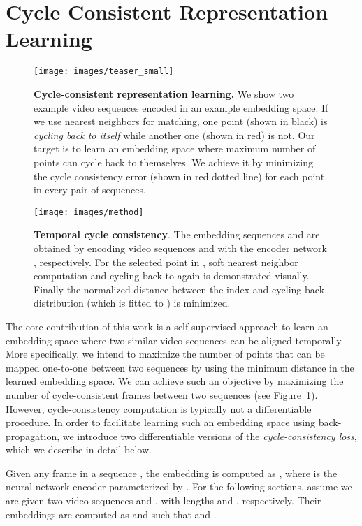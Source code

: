 \documentclass[10pt,twocolumn,letterpaper]{article}
\begin{document}
 \section{Cycle Consistent Representation Learning}
\label{sec:method}

\begin{figure}[t!]
\centering
\texttt{[image: images/teaser\_small]}
\caption{{\bf Cycle-consistent representation learning.} We show two example video sequences encoded in an example embedding space. If we use nearest neighbors for matching, one point (shown in black) is \textit{cycling back to itself} while another one (shown in red) is not. Our target is to learn an embedding space where maximum number of points can cycle back to themselves. We achieve it by minimizing the cycle consistency error (shown in red dotted line) for each point in every pair of sequences.}
\label{fig:cycle}
\end{figure}

\begin{figure*}[!t]
\centering
\texttt{[image: images/method]}
\caption{{\bf Temporal cycle consistency}. The embedding sequences  and  are obtained by encoding video sequences  and  with the encoder network , respectively. For the selected point  in , soft nearest neighbor computation and cycling back to  again is demonstrated visually. Finally the normalized distance between the index  and cycling back distribution  (which is fitted to ) is minimized.}
\label{fig:soft_cycle_consistency}
\end{figure*}

The core contribution of this work is a self-supervised approach to learn an embedding space where two similar video sequences can be aligned temporally. More specifically, we intend to maximize the number of points that can be mapped one-to-one between two sequences by using the minimum distance in the learned embedding space. We can achieve such an objective by maximizing the number of cycle-consistent frames between two sequences (see Figure~\ref{fig:cycle}). However, cycle-consistency computation is typically not a differentiable procedure. In order to facilitate learning such an embedding space using back-propagation, we introduce two differentiable versions of the \textit{cycle-consistency loss}, which we describe in detail below.

Given any frame  in a sequence , the embedding is computed as , where  is the neural network encoder parameterized by . For the following sections, assume we are given two video sequences  and , with lengths  and , respectively. Their embeddings are computed as  and  such that  and . 
\end{document}
